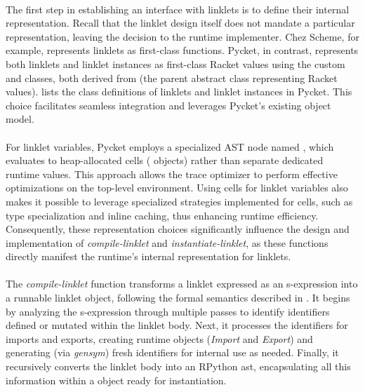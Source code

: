 		\paragraph{}%
			The first step in establishing an interface with linklets is to define their internal representation. Recall that the linklet design itself does not mandate a particular representation, leaving the decision to the runtime implementer. Chez Scheme, for example, represents linklets as first-class functions. Pycket, in contrast, represents both linklets and linklet instances as first-class Racket values using the custom  and  classes, both derived from  (the parent abstract class representing Racket values).  lists the class definitions of linklets and linklet instances in Pycket. This choice facilitates seamless integration and leverages Pycket’s existing object model.


		\paragraph{}%
			For linklet variables, Pycket employs a specialized AST node named , which evaluates to heap-allocated cells ( objects) rather than separate dedicated runtime values. This approach allows the trace optimizer to perform effective optimizations on the top-level environment. Using cells for linklet variables also makes it possible to leverage specialized strategies implemented for cells, such as type specialization and inline caching, thus enhancing runtime efficiency. Consequently, these representation choices significantly influence the design and implementation of \emph{compile-linklet} and \emph{instantiate-linklet}, as these functions directly manifest the runtime’s internal representation for linklets.

		\paragraph{}%
			The \emph{compile-linklet} function transforms a linklet expressed as an s-expression into a runnable linklet object, following the formal semantics described in . It begins by analyzing the s-expression through multiple passes to identify identifiers defined or mutated within the linklet body. Next, it processes the identifiers for imports and exports, creating runtime objects (\emph{Import} and \emph{Export}) and generating (via \emph{gensym}) fresh identifiers for internal use as needed. Finally, it recursively converts the linklet body into an RPython \gls{ast}, encapsulating all this information within a  object ready for instantiation.

